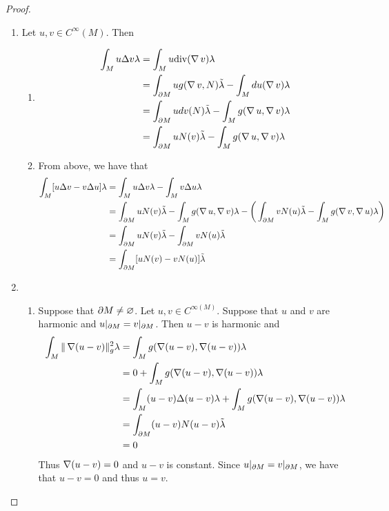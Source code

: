 \documentclass{book}
\begin{document}
\begin{proof}\
	\begin{enumerate}
		\item Let $u,v \in C^{\infty}(M)$. Then
		\begin{enumerate}
			\item 
			\begin{align*}
				\int_{M} u \Delta v \lambda 
				& = \int_M u \text{div} (\operatorname{\nabla} v ) \lambda \\
				& = \int_{\partial M} u g(\operatorname{\nabla} v, N) \tilde{\lambda}  - \int_M du( \operatorname{\nabla} v) \lambda \\
				& =  \int_{\partial M} u dv(N) \tilde{\lambda} -  \int_M g(\operatorname{\nabla} u, \operatorname{\nabla} v) \lambda \\
				& = \int_{\partial M} u N(v)  \tilde{\lambda}  -  \int_M g(\operatorname{\nabla} u, \operatorname{\nabla} v) \lambda \\
			\end{align*} 
			\item From above, we have that
			\begin{align*}
				\int_{M} [u \Delta v - v \Delta u] \lambda
				& = \int_{M} u \Delta v \lambda - \int_{M} v \Delta u \lambda \\
				& = \int_{\partial M} u N(v) \tilde{\lambda}   -  \int_M g(\operatorname{\nabla} u, \operatorname{\nabla} v) \lambda - \bigg (\int_{\partial M} v N(u) \tilde{\lambda}  -  \int_M g(\operatorname{\nabla} v, \operatorname{\nabla} u) \lambda \bigg) \\
				& = \int_{\partial M} u N(v) \tilde{\lambda}  - \int_{\partial M} v N(u) \tilde{\lambda} \\
				& = \int_{\partial M} [u N(v) - v N(u)] \tilde{\lambda} 
			\end{align*}
		\end{enumerate}
		\item 
		\begin{enumerate}
			\item Suppose that $\partial M \neq \varnothing$. Let $u,v \in C^{\infty(M)}$. Suppose that $u$ and $v$ are harmonic and $u|_{\partial M} = v|_{\partial M}$. Then $u-v$ is harmonic and 
			\begin{align*}
				\int_M \|\operatorname{\nabla} (u-v)\|_g^2 \lambda 
				& = \int_M g(\operatorname{\nabla} (u-v), \operatorname{\nabla}(u-v)) \lambda \\
				& = 0 + \int_M g(\operatorname{\nabla} (u-v), \operatorname{\nabla}(u-v)) \lambda \\
				& = \int_{M} (u-v) \Delta (u-v) \lambda + \int_M g(\operatorname{\nabla} (u-v), \operatorname{\nabla}(u-v)) \lambda \\
				& = \int_{\partial M} (u-v) N(u-v) \tilde{\lambda} \\
				& = 0
			\end{align*} 
			Thus $\operatorname{\nabla} (u-v) = 0$ and $u - v$ is constant. Since $u|_{\partial M} = v|_{\partial M}$, we have that $u - v = 0$ and thus $u = v$.

\end{enumerate}
\end{enumerate}
\end{proof}
\end{document}
